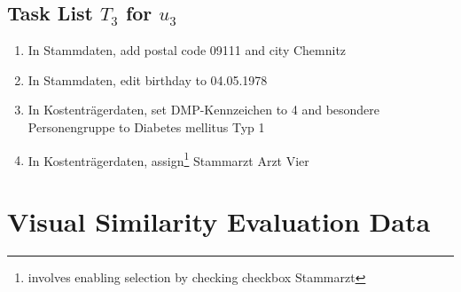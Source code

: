 \begin{appendix}
\subsection*{Task List \(T_3\) for \(u_3\)}
\begin{enumerate}[start=1,label={\(t_{3,\arabic*}\)}]
\item In Stammdaten, add postal code 09111 and city Chemnitz
\item In Stammdaten, edit birthday to 04.05.1978
\item In Kostentr{\"a}gerdaten, set DMP-Kennzeichen to 4 and besondere Personengruppe to Diabetes mellitus Typ 1
\item In Kostentr{\"a}gerdaten, assign\footnote{involves enabling selection by checking checkbox Stammarzt} Stammarzt Arzt Vier
\end{enumerate}

\section{Visual Similarity Evaluation Data}
\vspace{15pt}


\end{appendix}
